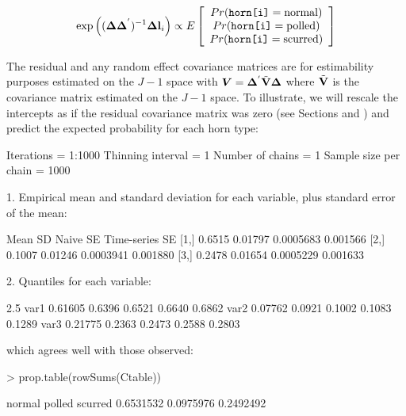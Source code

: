 \documentclass{article}
\begin{document}
\begin{equation}
\textrm{exp}\left(({\bm \Delta}{\bm \Delta}^{'})^{-1}{\bm \Delta}{\bf l}_{i}\right) \propto E\left[\begin{array}{c} Pr(\texttt{horn[i]}=\textrm{normal})\\ Pr(\texttt{horn[i]}=\textrm{polled})\\ Pr(\texttt{horn[i]}=\textrm{scurred}) \end{array} \right]
\end{equation}

The residual and any random effect covariance matrices are for estimability purposes estimated on the $J-1$ space with  ${\bm V}={\bm \Delta}^{'}\tilde{\bf V}{\bm \Delta}$ where $\tilde{\bf V}$ is the covariance matrix estimated on the $J-1$ space. To illustrate, we will rescale the intercepts as if the residual covariance matrix was zero (see Sections and \label{pred-sec} \label{cat-sec}) and predict the expected probability for each horn type:

\begin{Schunk}
\begin{Soutput}
Iterations = 1:1000
Thinning interval = 1 
Number of chains = 1 
Sample size per chain = 1000 

1. Empirical mean and standard deviation for each variable,
   plus standard error of the mean:

       Mean      SD  Naive SE Time-series SE
[1,] 0.6515 0.01797 0.0005683       0.001566
[2,] 0.1007 0.01246 0.0003941       0.001880
[3,] 0.2478 0.01654 0.0005229       0.001633

2. Quantiles for each variable:

        2.5%
var1 0.61605 0.6396 0.6521 0.6640 0.6862
var2 0.07762 0.0921 0.1002 0.1083 0.1289
var3 0.21775 0.2363 0.2473 0.2588 0.2803
\end{Soutput}
\end{Schunk}

which agrees well with those observed:

\begin{Schunk}
\begin{Sinput}
> prop.table(rowSums(Ctable))
\end{Sinput}
\begin{Soutput}
   normal    polled   scurred 
0.6531532 0.0975976 0.2492492 
\end{Soutput}
\end{Schunk}
\end{document}
